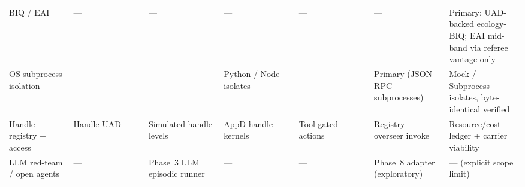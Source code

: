 \begin{landscape}
\begin{longtable}{@{}L{0.12\linewidth}L{0.1467\linewidth}L{0.1467\linewidth}L{0.1467\linewidth}L{0.1467\linewidth}L{0.1467\linewidth}L{0.1467\linewidth}@{}}
BIQ / EAI & --- & --- & --- & --- & --- & Primary: UAD-backed ecology-BIQ; EAI mid-band via referee vantage only \\
OS subprocess isolation & --- & --- & Python / Node isolates & --- & Primary (JSON-RPC subprocesses) & Mock / Subprocess isolates, byte-identical verified \\
Handle registry + access & Handle-UAD & Simulated handle levels & AppD handle kernels & Tool-gated actions & Registry + overseer invoke & Resource/cost ledger + carrier viability \\
LLM red-team / open agents & --- & Phase~3 LLM episodic runner & --- & --- & Phase~8 adapter (exploratory) & --- (explicit scope limit) \\
\end{longtable}

\normalsize
\renewcommand{\arraystretch}{1.0}
\end{landscape}
